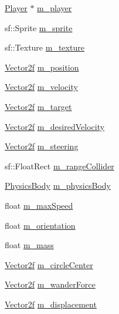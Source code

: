 \begin{DoxyCompactItemize}
\item 
\mbox{\hyperlink{class_player}{Player}} $\ast$ \mbox{\hyperlink{class_a_i_a9fbe0ffe6d8e18e76f2fde95e05688d8}{m\+\_\+player}}
\item 
sf\+::\+Sprite \mbox{\hyperlink{class_a_i_ac1e86894edd8bda2591c578ef4cb0f33}{m\+\_\+sprite}}
\item 
sf\+::\+Texture \mbox{\hyperlink{class_a_i_aeb01d3a3dfe5722217097a2a7a924a8b}{m\+\_\+texture}}
\item 
\mbox{\hyperlink{class_vector2f}{Vector2f}} \mbox{\hyperlink{class_a_i_a9aaff71f56bce9c3dcc7e2da78f57a5a}{m\+\_\+position}}
\item 
\mbox{\hyperlink{class_vector2f}{Vector2f}} \mbox{\hyperlink{class_a_i_a33985bd7d9e5593015255eccbfb4cf76}{m\+\_\+velocity}}
\item 
\mbox{\hyperlink{class_vector2f}{Vector2f}} \mbox{\hyperlink{class_a_i_a91d93e35a65caef2fd7a087dfa99cd07}{m\+\_\+target}}
\item 
\mbox{\hyperlink{class_vector2f}{Vector2f}} \mbox{\hyperlink{class_a_i_ad84240b48bd8e5697d070d47a815148d}{m\+\_\+desired\+Velocity}}
\item 
\mbox{\hyperlink{class_vector2f}{Vector2f}} \mbox{\hyperlink{class_a_i_a0f5d53c997939a0dcb77a93b7855726e}{m\+\_\+steering}}
\item 
sf\+::\+Float\+Rect \mbox{\hyperlink{class_a_i_ada01ba361d0137e4aa75f4bac6e1b5e0}{m\+\_\+range\+Collider}}
\item 
\mbox{\hyperlink{class_physics_body}{Physics\+Body}} \mbox{\hyperlink{class_a_i_aa507f59217affc35b609c276de0e6f68}{m\+\_\+physics\+Body}}
\item 
float \mbox{\hyperlink{class_a_i_a614a539cce03130bcdbd8f78a5b8160a}{m\+\_\+max\+Speed}}
\item 
float \mbox{\hyperlink{class_a_i_a0ab1fa08223d1f464b10b0b62a0605d8}{m\+\_\+orientation}}
\item 
float \mbox{\hyperlink{class_a_i_a5b71bb4f4fc843c27be8ce7df287d998}{m\+\_\+mass}}
\item 
\mbox{\hyperlink{class_vector2f}{Vector2f}} \mbox{\hyperlink{class_a_i_ac0ba44ffdc797966a26fc8d44b0b2faf}{m\+\_\+circle\+Center}}
\item 
\mbox{\hyperlink{class_vector2f}{Vector2f}} \mbox{\hyperlink{class_a_i_ad68c628e218a76dc48d50cba41cd8c54}{m\+\_\+wander\+Force}}
\item 
\mbox{\hyperlink{class_vector2f}{Vector2f}} \mbox{\hyperlink{class_a_i_a36110c862108ea5166046dd460a7ef76}{m\+\_\+displacement}}

\end{DoxyCompactItemize}
